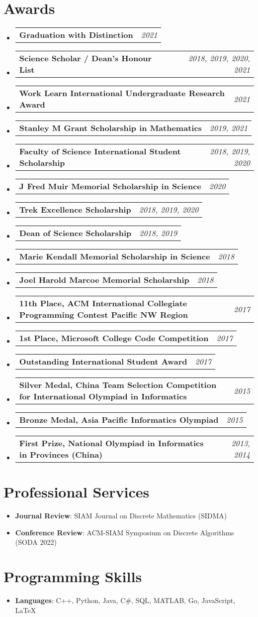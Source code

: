 \documentclass[letterpaper,11pt]{article}
\makeatletter
\newcommand{\resumeItem}[2]{
  \item\small{
    \textbf{#1}{: #2 \vspace{-2pt}}
  }
}
\newcommand{\awardSubItem}[2]{
  \item
    \begin{tabular*}{0.97\textwidth}{l@{\extracolsep{\fill}}r}
      \textbf{\small #1} & \textit{\small #2} \\
    \end{tabular*}\vspace{-8pt}
}
\newcommand{\resumeSubItem}[2]{\resumeItem{#1}{#2}\vspace{-4pt}}
\newcommand{\resumeSubHeadingListStart}{\begin{itemize}[leftmargin=*]}
\newcommand{\resumeSubHeadingListEnd}{\end{itemize}}
\makeatother
\begin{document}
\section{Awards}
  \resumeSubHeadingListStart
    \awardSubItem{Graduation with Distinction}{2021}
    \awardSubItem{Science Scholar / Dean's Honour List}{2018, 2019, 2020, 2021}
    \awardSubItem{Work Learn International Undergraduate Research Award}{2021}
    \awardSubItem{Stanley M Grant Scholarship in Mathematics}{2019, 2021}
    \awardSubItem{Faculty of Science International Student Scholarship}{2018, 2019, 2020}
    \awardSubItem{J Fred Muir Memorial Scholarship in Science}{2020}
    \awardSubItem{Trek Excellence Scholarship}{2018, 2019, 2020}
    \awardSubItem{Dean of Science Scholarship}{2018, 2019}
    \awardSubItem{Marie Kendall Memorial Scholarship in Science}{2018}
    \awardSubItem{Joel Harold Marcoe Memorial Scholarship}{2018}
    \awardSubItem{11th Place, ACM International Collegiate Programming Contest Pacific NW Region}{2017}
    \awardSubItem{1st Place, Microsoft College Code Competition}{2017}
    \awardSubItem{Outstanding International Student Award}{2017}
    \awardSubItem{Silver Medal, China Team Selection Competition for International Olympiad in Informatics}{2015}
    \awardSubItem{Bronze Medal, Asia Pacific Informatics Olympiad}{2015}
    \awardSubItem{First Prize, National Olympiad in Informatics in Provinces (China)}{2013, 2014}
  \resumeSubHeadingListEnd

\section{Professional Services}
  \resumeSubHeadingListStart
    \resumeSubItem{Journal Review}{SIAM Journal on Discrete Mathematics (SIDMA)}
    \resumeSubItem{Conference Review}{ACM-SIAM Symposium on Discrete Algorithms (SODA 2022)}
  \resumeSubHeadingListEnd

\section{Programming Skills}
  \resumeSubHeadingListStart
    \resumeSubItem{Languages}
      {C++, Python, Java, C\#, SQL, MATLAB, Go, JavaScript, \LaTeX} \\
  \resumeSubHeadingListEnd


\end{document}
